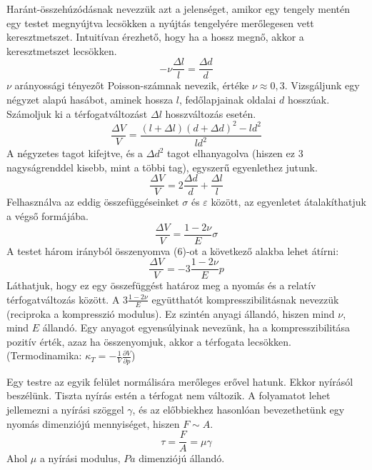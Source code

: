 \documentclass[a4paper,12pt]{article}
\begin{document}
Haránt-összehúzódásnak nevezzük azt a jelenséget, amikor egy tengely mentén egy testet megnyújtva lecsökken a nyújtás tengelyére merőlegesen vett keresztmetszet. Intuitívan érezhető, hogy ha a hossz megnő, akkor a keresztmetszet lecsökken.
\begin{equation}
-\nu\frac{\Delta l}{l}=\frac{\Delta d}{d}
\end{equation} 
$\nu$ arányossági tényezőt Poisson-számnak nevezik, értéke $\nu\approx 0,3$.
Vizsgáljunk egy négyzet alapú hasábot, aminek hossza $l$, fedőlapjainak oldalai $d$ hosszúak. Számoljuk ki a térfogatváltozást $\Delta l$ hosszváltozás esetén.
\begin{equation}
\frac{\Delta V}{V}=\frac{(l+\Delta l)(d+\Delta d)^2-ld^2}{ld^2}
\end{equation} 
A négyzetes tagot kifejtve, és a $\Delta d^2$ tagot elhanyagolva (hiszen ez 3 nagyságrenddel kisebb, mint a többi tag), egyszerű egyenlethez jutunk.
\begin{equation}
\frac{\Delta V}{V}=2\frac{\Delta d}{d}+\frac{\Delta l}{l}
\end{equation}
Felhasználva az eddig összefüggéseinket $\sigma$ és $\varepsilon$ között, az egyenletet átalakíthatjuk a végső formájába.
\begin{equation}
\frac{\Delta V}{V}=\frac{1-2\nu}{E}\sigma
\end{equation}
A testet három irányból összenyomva (6)-ot a következő alakba lehet átírni:
\begin{equation}
\frac{\Delta V}{V}=-3\frac{1-2\nu}{E}p
\end{equation}
Láthatjuk, hogy ez egy összefüggést határoz meg a nyomás és a relatív térfogatváltozás között. A $3\frac{1-2\nu}{E}$ együtthatót kompresszibilitásnak nevezzük (reciproka a kompresszió modulus). Ez szintén anyagi állandó, hiszen mind $\nu$, mind $E$ állandó. Egy anyagot egyensúlyinak nevezünk, ha a kompresszibilitása pozitív érték, azaz ha összenyomjuk, akkor a térfogata lecsökken. (Termodinamika: $\kappa_T=-\frac{1}{V}\frac{\partial V}{\partial p}$)

Egy testre az egyik felület normálisára merőleges erővel hatunk. Ekkor nyírásól beszélünk. Tiszta nyírás estén a térfogat nem változik. A folyamatot lehet jellemezni a nyírási szöggel $\gamma$, és az előbbiekhez hasonlóan bevezethetünk egy nyomás dimenziójú mennyiséget, hiszen $F\sim A$.
\begin{equation}
\tau=\frac{F}{A}=\mu\gamma
\end{equation}
Ahol $\mu$ a nyírási modulus, $Pa$ dimenziójú állandó.
\end{document}

